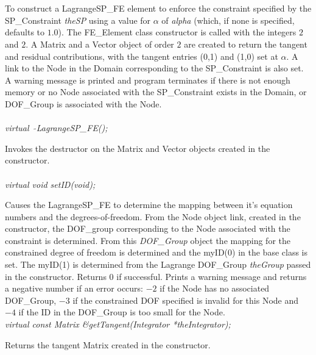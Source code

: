   \\
\\
To construct a LagrangeSP\_FE element to enforce the constraint
specified by the SP\_Constraint {\em theSP} using a value for
$\alpha$ of {\em alpha} (which, if none is specified, defaults to
$1.0$). The FE\_Element class constructor is called with 
the integers $2$ and $2$. A Matrix and a Vector object of order $2$
are created to return the tangent and residual contributions, with the
tangent entries (0,1) and (1,0) set at $\alpha$. A link to the Node in the Domain
corresponding to the SP\_Constraint is also set. A warning message is
printed and program terminates if there is not enough memory or no
Node associated with the SP\_Constraint exists in the Domain, or
DOF\_Group is associated with the Node.\\

  \\
{\em virtual~ $\tilde{}$LagrangeSP\_FE();}  

Invokes the destructor on the Matrix and Vector objects created in the
constructor. \\

  \\
{\em virtual void setID(void);} 

Causes the LagrangeSP\_FE to determine the mapping between it's equation
numbers and the degrees-of-freedom. From the Node object link, created
in the constructor, the DOF\_group corresponding to the Node
associated with the constraint is determined. From this {\em
DOF\_Group} object the mapping for the constrained degree of freedom
is determined and the myID(0) in the base class is set. The myID(1) is
determined from the Lagrange DOF\_Group {\em theGroup} passed in the
constructor. Returns $0$ if 
successful. Prints a warning message and returns a negative number if
an error occurs: $-2$ if the
Node has no associated DOF\_Group, $-3$ if the constrained DOF
specified is invalid for this Node and $-4$ if the ID in the
DOF\_Group is too small for the Node. \\ 

{\em virtual const Matrix \&getTangent(Integrator *theIntegrator);} 

Returns the tangent Matrix created in the constructor. \\

